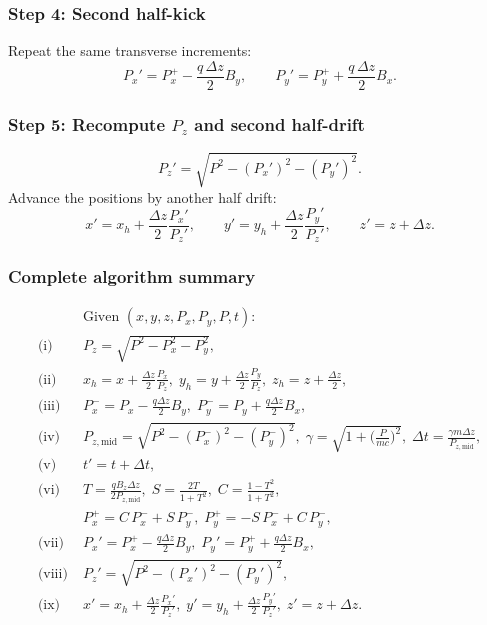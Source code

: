 \subsubsection{Step 4: Second half-kick}
Repeat the same transverse increments:
\[
P_x' = P_x^+ - \frac{q\,\Delta z}{2}B_y, \qquad
P_y' = P_y^+ + \frac{q\,\Delta z}{2}B_x.
\]

\subsubsection{Step 5: Recompute \(P_z\) and second half-drift}
\[
P_z' = \sqrt{P^2 - (P_x')^2 - (P_y')^2}.
\]
Advance the positions by another half drift:
\[
x' = x_h + \frac{\Delta z}{2}\frac{P_x'}{P_z'}, \qquad
y' = y_h + \frac{\Delta z}{2}\frac{P_y'}{P_z'}, \qquad
z' = z + \Delta z.
\]

\subsubsection{Complete algorithm summary}
\begin{align*}
&\text{Given }(x,y,z,P_x,P_y,P,t):\\[3pt]
\text{(i)}\;& P_z = \sqrt{P^2 - P_x^2 - P_y^2},\\
\text{(ii)}\;& x_h = x + \frac{\Delta z}{2}\frac{P_x}{P_z},\;
               y_h = y + \frac{\Delta z}{2}\frac{P_y}{P_z},\;
               z_h = z + \frac{\Delta z}{2},\\
\text{(iii)}\;& P_x^- = P_x - \frac{q\Delta z}{2}B_y,\;
                P_y^- = P_y + \frac{q\Delta z}{2}B_x,\\
\text{(iv)}\;& P_{z,\mathrm{mid}} = \sqrt{P^2 - (P_x^-)^2 - (P_y^-)^2},\;
                \gamma = \sqrt{1+\!\Big(\frac{P}{mc}\Big)^2},\;
                \Delta t = \frac{\gamma m\Delta z}{P_{z,\mathrm{mid}}},\\
\text{(v)}\;& t' = t + \Delta t,\\
\text{(vi)}\;& T = \frac{qB_z\Delta z}{2P_{z,\mathrm{mid}}},\;
                S = \frac{2T}{1+T^2},\;
                C = \frac{1-T^2}{1+T^2},\\
& P_x^+ = C\,P_x^- + S\,P_y^-,\;
  P_y^+ = -S\,P_x^- + C\,P_y^-,\\
\text{(vii)}\;& P_x' = P_x^+ - \frac{q\Delta z}{2}B_y,\;
                P_y' = P_y^+ + \frac{q\Delta z}{2}B_x,\\
\text{(viii)}\;& P_z' = \sqrt{P^2 - (P_x')^2 - (P_y')^2},\\
\text{(ix)}\;& x' = x_h + \frac{\Delta z}{2}\frac{P_x'}{P_z'},\;
                y' = y_h + \frac{\Delta z}{2}\frac{P_y'}{P_z'},\;
                z' = z + \Delta z.
\end{align*}

